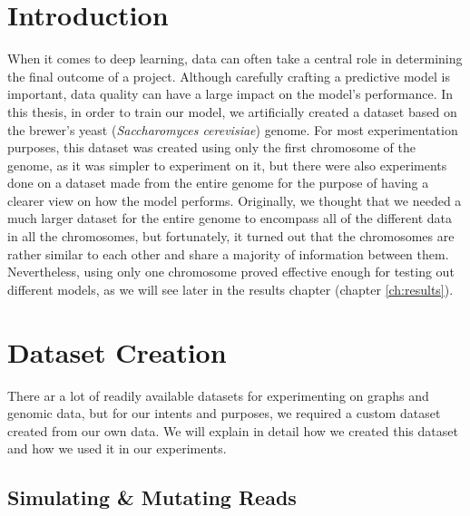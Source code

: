 \documentclass[times, utf8, diplomski, english]{fer_eng}
\begin{document}
\section{Introduction}
\label{sec:introduction}

When it comes to deep learning, data can often take a central role in determining the final outcome of a project. Although carefully crafting a predictive model is important, data quality can have a large impact on the model's performance. In this thesis, in order to train our model, we artificially created a dataset based on the brewer's yeast (\textit{Saccharomyces cerevisiae}) genome. For most experimentation purposes, this dataset was created using only the first chromosome of the genome, as it was simpler to experiment on it, but there were also experiments done on a dataset made from the entire genome for the purpose of having a clearer view on how the model performs. Originally, we thought that we needed a much larger dataset for the entire genome to encompass all of the different data in all the chromosomes, but fortunately, it turned out that the chromosomes are rather similar to each other and share a majority of information between them. Nevertheless, using only one chromosome proved effective enough for testing out different models, as we will see later in the results chapter (chapter \ref{ch:results}).

\section{Dataset Creation}
\label{sec:dataset creation}

There ar a lot of readily available datasets for experimenting on graphs and genomic data, but for our intents and purposes, we required a custom dataset created from our own data. We will explain in detail how we created this dataset and how we used it in our experiments.

\subsection{Simulating \& Mutating Reads}
\end{document}
